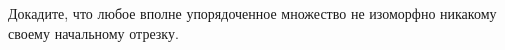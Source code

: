 Докадите, что любое вполне упорядоченное множество не изоморфно никакому своему начальному отрезку.
